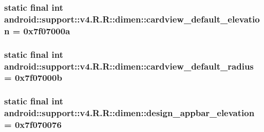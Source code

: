 \hypertarget{classandroid_1_1support_1_1v4_1_1_r_1_1dimen_8bf388774366f0c260e832149121b165}{
\subsubsection[{cardview\_\-default\_\-elevation}]{\setlength{\rightskip}{0pt plus 5cm}static final int android::support::v4.R.R::dimen::cardview\_\-default\_\-elevation = 0x7f07000a}}
\label{classandroid_1_1support_1_1v4_1_1_r_1_1dimen_8bf388774366f0c260e832149121b165}


\hypertarget{classandroid_1_1support_1_1v4_1_1_r_1_1dimen_c9470c6568154002f19b28d154d0cc94}{
\subsubsection[{cardview\_\-default\_\-radius}]{\setlength{\rightskip}{0pt plus 5cm}static final int android::support::v4.R.R::dimen::cardview\_\-default\_\-radius = 0x7f07000b}}
\label{classandroid_1_1support_1_1v4_1_1_r_1_1dimen_c9470c6568154002f19b28d154d0cc94}


\hypertarget{classandroid_1_1support_1_1v4_1_1_r_1_1dimen_7906470ec92428992e4dba219f442c8a}{
\subsubsection[{design\_\-appbar\_\-elevation}]{\setlength{\rightskip}{0pt plus 5cm}static final int android::support::v4.R.R::dimen::design\_\-appbar\_\-elevation = 0x7f070076}}
\label{classandroid_1_1support_1_1v4_1_1_r_1_1dimen_7906470ec92428992e4dba219f442c8a}


